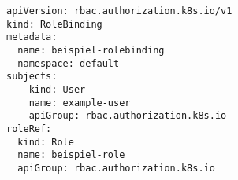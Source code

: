 \begin{verbatim}
apiVersion: rbac.authorization.k8s.io/v1
kind: RoleBinding
metadata:
  name: beispiel-rolebinding
  namespace: default
subjects:
  - kind: User
    name: example-user
    apiGroup: rbac.authorization.k8s.io
roleRef:
  kind: Role
  name: beispiel-role
  apiGroup: rbac.authorization.k8s.io
\end{verbatim}
